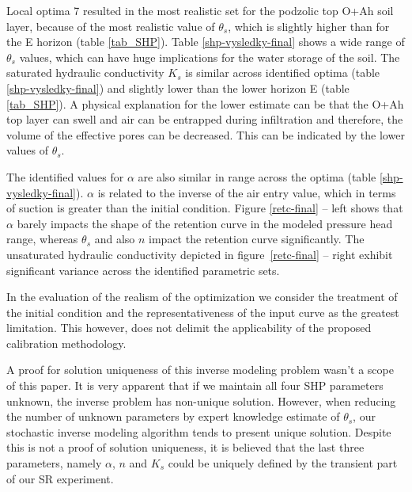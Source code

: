 \documentclass[review,times,3p,10pt]{elsarticle}
\begin{document}
Local optima 7 resulted in the most realistic set for the podzolic top O+Ah soil layer, because of the most realistic value of $\theta_s$, which is slightly higher than for the E horizon (table \ref{tab_SHP}). Table \ref{shp-vysledky-final} shows a wide range of $\theta_s$ values, which can have huge implications for the water storage of the soil. The saturated hydraulic conductivity $K_s$ is similar across identified optima (table \ref{shp-vysledky-final}) and slightly lower than the lower horizon E (table \ref{tab_SHP}). A physical explanation for the lower estimate can be that the O+Ah top layer can swell and air can be entrapped during infiltration and therefore, the volume of the effective pores can be decreased. This can be indicated by the lower values of $\theta_s$. 

The identified values for $\alpha$ are also similar in range across the optima (table \ref{shp-vysledky-final}). $\alpha$ is related to the inverse of the air entry value, which in terms of suction is greater than the initial condition. Figure \ref{retc-final} -- left shows that $\alpha$ barely impacts the shape of the retention curve in the modeled pressure head range, whereas $\theta_s$ and also $n$ impact the retention curve significantly. {The unsaturated hydraulic conductivity depicted in figure~\ref{retc-final} -- right exhibit significant variance across the identified parametric sets.}

In the evaluation of the realism of the optimization we consider the treatment of the initial condition and the representativeness of the input curve as the greatest limitation. This however, does not delimit the applicability of the proposed calibration methodology. 

A proof for solution uniqueness of this inverse modeling problem wasn't a scope of this paper. It is very apparent that if we maintain all four SHP parameters unknown, the inverse problem has non-unique solution. However, when reducing the number of unknown parameters by expert knowledge estimate of $\theta_s$, our stochastic inverse modeling algorithm  \citep{grade} tends to present unique solution. Despite this is not a proof of solution uniqueness,
it is believed that the last three parameters, namely $\alpha$, $n$ and $K_s$ could be uniquely defined by the transient part of our SR experiment.
 
\end{document}
